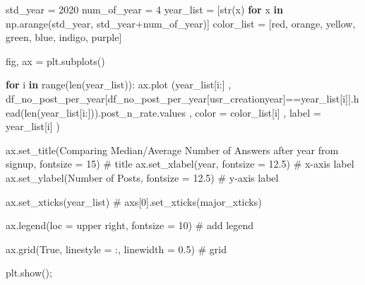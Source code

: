 \documentclass[
  letterpaper,
  DIV=11,
  numbers=noendperiod]{scrartcl}
\newenvironment{Shaded}{\begin{snugshade}}{\end{snugshade}}
\newcommand{\BuiltInTok}[1]{\textcolor[rgb]{0.00,0.23,0.31}{#1}}
\newcommand{\CommentTok}[1]{\textcolor[rgb]{0.37,0.37,0.37}{#1}}
\newcommand{\ControlFlowTok}[1]{\textcolor[rgb]{0.00,0.23,0.31}{\textbf{#1}}}
\newcommand{\DecValTok}[1]{\textcolor[rgb]{0.68,0.00,0.00}{#1}}
\newcommand{\FloatTok}[1]{\textcolor[rgb]{0.68,0.00,0.00}{#1}}
\newcommand{\KeywordTok}[1]{\textcolor[rgb]{0.00,0.23,0.31}{\textbf{#1}}}
\newcommand{\NormalTok}[1]{\textcolor[rgb]{0.00,0.23,0.31}{#1}}
\newcommand{\OperatorTok}[1]{\textcolor[rgb]{0.37,0.37,0.37}{#1}}
\newcommand{\StringTok}[1]{\textcolor[rgb]{0.13,0.47,0.30}{#1}}
\newcommand{\VariableTok}[1]{\textcolor[rgb]{0.07,0.07,0.07}{#1}}
\begin{document}
\begin{Shaded}
\begin{Highlighting}[]
\NormalTok{std\_year }\OperatorTok{=} \DecValTok{2020}
\NormalTok{num\_of\_year }\OperatorTok{=} \DecValTok{4}
\NormalTok{year\_list }\OperatorTok{=}\NormalTok{ [}\BuiltInTok{str}\NormalTok{(x) }\ControlFlowTok{for}\NormalTok{ x }\KeywordTok{in}\NormalTok{ np.arange(std\_year, std\_year}\OperatorTok{+}\NormalTok{num\_of\_year)]}
\NormalTok{color\_list }\OperatorTok{=}\NormalTok{ [}\StringTok{\textquotesingle{}red\textquotesingle{}}\NormalTok{, }\StringTok{\textquotesingle{}orange\textquotesingle{}}\NormalTok{, }\StringTok{\textquotesingle{}yellow\textquotesingle{}}\NormalTok{, }\StringTok{\textquotesingle{}green\textquotesingle{}}\NormalTok{, }\StringTok{\textquotesingle{}blue\textquotesingle{}}\NormalTok{, }\StringTok{\textquotesingle{}indigo\textquotesingle{}}\NormalTok{, }\StringTok{\textquotesingle{}purple\textquotesingle{}}\NormalTok{]}

\NormalTok{fig, ax }\OperatorTok{=}\NormalTok{ plt.subplots()}

\ControlFlowTok{for}\NormalTok{ i }\KeywordTok{in} \BuiltInTok{range}\NormalTok{(}\BuiltInTok{len}\NormalTok{(year\_list)):   }
\NormalTok{        ax.plot (year\_list[i:]}
\NormalTok{        , df\_no\_post\_per\_year[df\_no\_post\_per\_year[}\StringTok{\textquotesingle{}usr\_creationyear\textquotesingle{}}\NormalTok{]}\OperatorTok{==}\NormalTok{year\_list[i]].head(}\BuiltInTok{len}\NormalTok{(year\_list[i:])).post\_n\_rate.values}
\NormalTok{        ,  color }\OperatorTok{=}\NormalTok{ color\_list[i]}
\NormalTok{        ,  label }\OperatorTok{=}\NormalTok{ year\_list[i]}
\NormalTok{        ) }


\NormalTok{ax.set\_title(}\StringTok{\textquotesingle{}Comparing Median/Average Number of Answers after year from signup\textquotesingle{}}\NormalTok{, fontsize }\OperatorTok{=} \DecValTok{15}\NormalTok{) }\CommentTok{\# title}
\NormalTok{ax.set\_xlabel(}\StringTok{\textquotesingle{}year\textquotesingle{}}\NormalTok{, fontsize }\OperatorTok{=} \FloatTok{12.5}\NormalTok{) }\CommentTok{\# x{-}axis label}
\NormalTok{ax.set\_ylabel(}\StringTok{\textquotesingle{}Number of Posts\textquotesingle{}}\NormalTok{, fontsize }\OperatorTok{=} \FloatTok{12.5}\NormalTok{) }\CommentTok{\# y{-}axis label}

\NormalTok{ax.set\_xticks(year\_list)}
\CommentTok{\# axs[0].set\_xticks(major\_xticks)}

\NormalTok{ax.legend(loc }\OperatorTok{=} \StringTok{\textquotesingle{}upper right\textquotesingle{}}\NormalTok{, fontsize }\OperatorTok{=} \DecValTok{10}\NormalTok{) }\CommentTok{\# add legend}

\NormalTok{ax.grid(}\VariableTok{True}\NormalTok{, linestyle }\OperatorTok{=} \StringTok{\textquotesingle{}:\textquotesingle{}}\NormalTok{, linewidth }\OperatorTok{=} \FloatTok{0.5}\NormalTok{) }\CommentTok{\# grid}

\NormalTok{plt.show()}\OperatorTok{;}
\end{Highlighting}
\end{Shaded}
\end{document}
